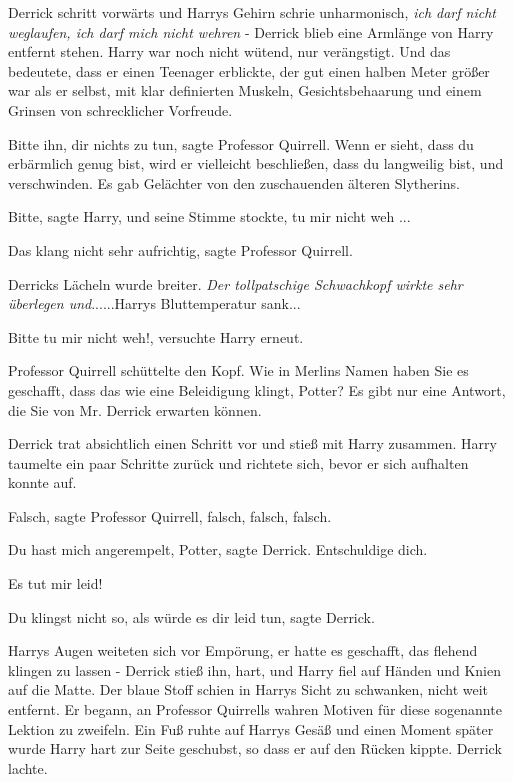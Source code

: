Derrick schritt vorwärts und Harrys Gehirn schrie unharmonisch, \emph{ich darf
nicht weglaufen, ich darf mich nicht wehren} - Derrick blieb eine Armlänge von
Harry entfernt stehen. Harry war noch nicht wütend, nur verängstigt. Und das
bedeutete, dass er einen Teenager erblickte, der gut einen halben Meter größer
war als er selbst, mit klar definierten Muskeln, Gesichtsbehaarung und einem
Grinsen von schrecklicher Vorfreude.

\glqq{}Bitte ihn, dir nichts zu tun\grqq{}, sagte Professor Quirrell. \glqq{}Wenn
er sieht, dass du erbärmlich genug bist, wird er vielleicht beschließen, dass du
langweilig bist, und verschwinden.\grqq{} Es gab Gelächter von den zuschauenden
älteren Slytherins.

\glqq{}Bitte\grqq{}, sagte Harry, und seine Stimme stockte, \glqq{}tu mir nicht
weh ...\grqq{}

\glqq{}Das klang nicht sehr aufrichtig\grqq{}, sagte Professor Quirrell.

Derricks Lächeln wurde breiter. \emph{Der tollpatschige Schwachkopf wirkte sehr
überlegen und}......Harrys Bluttemperatur sank...

\glqq{}Bitte tu mir nicht weh!\grqq{}, versuchte Harry erneut.

Professor Quirrell schüttelte den Kopf. \glqq{}Wie in Merlins Namen haben Sie es
geschafft, dass das wie eine Beleidigung klingt, Potter? Es gibt nur eine
Antwort, die Sie von Mr. Derrick erwarten können.\grqq{}

Derrick trat absichtlich einen Schritt vor und stieß mit Harry zusammen. Harry
taumelte ein paar Schritte zurück und richtete sich, bevor er sich aufhalten
konnte auf.

\glqq{}Falsch\grqq{}, sagte Professor Quirrell, \glqq{}falsch, falsch,
falsch.\grqq{}

\glqq{}Du hast mich angerempelt, Potter\grqq{}, sagte Derrick. \glqq{}Entschuldige
dich.\grqq{}

\glqq{}Es tut mir leid!\grqq{}

\glqq{}Du klingst nicht so, als würde es dir leid tun\grqq{}, sagte Derrick.

Harrys Augen weiteten sich vor Empörung, er hatte es geschafft, das flehend
klingen zu lassen - Derrick stieß ihn, hart, und Harry fiel auf Händen und Knien
auf die Matte. Der blaue Stoff schien in Harrys Sicht zu schwanken, nicht weit
entfernt. Er begann, an Professor Quirrells wahren Motiven für diese sogenannte
Lektion zu zweifeln. Ein Fuß ruhte auf Harrys Gesäß und einen Moment später
wurde Harry hart zur Seite geschubst, so dass er auf den Rücken kippte. Derrick
lachte.

